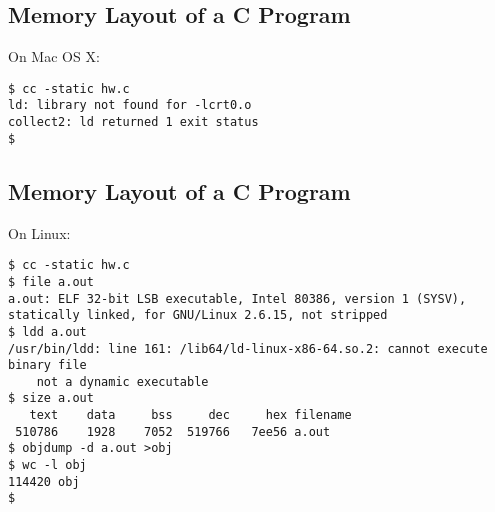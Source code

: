 \documentclass[xga]{xdvislides}
\begin{document}
\subsection{Memory Layout of a C Program}
On Mac OS X:
\begin{verbatim}
$ cc -static hw.c
ld: library not found for -lcrt0.o
collect2: ld returned 1 exit status
$
\end{verbatim}

\subsection{Memory Layout of a C Program}
On Linux:
\begin{verbatim}
$ cc -static hw.c
$ file a.out
a.out: ELF 32-bit LSB executable, Intel 80386, version 1 (SYSV),
statically linked, for GNU/Linux 2.6.15, not stripped
$ ldd a.out
/usr/bin/ldd: line 161: /lib64/ld-linux-x86-64.so.2: cannot execute binary file
	not a dynamic executable
$ size a.out
   text	   data	    bss	    dec	    hex	filename
 510786	   1928	   7052	 519766	  7ee56	a.out
$ objdump -d a.out >obj
$ wc -l obj
114420 obj
$
\end{verbatim}

%
\end{document}
